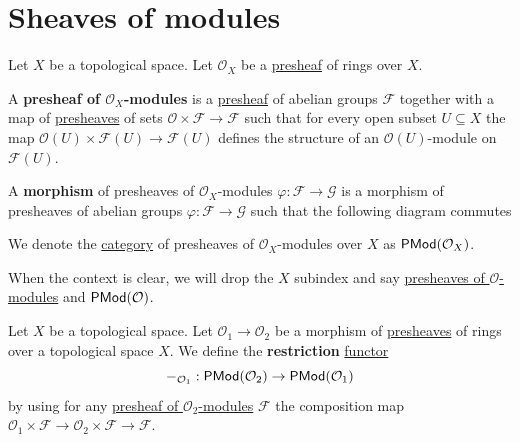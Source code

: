 \documentclass[../../../main]{subfiles}
\begin{document}
\section{Sheaves of modules} \label{sec:sheaves-of-modules}

\begin{definition} \label{def:presheaf-of-modules}
  Let \(X\) be a topological space.
  Let \(\mathcal{O}_{X}\) be a \hyperref[def:presheaf]{presheaf} of rings over \(X\).

  A \textbf{presheaf of \(\mathcal{O}_{X}\)-modules} is a \hyperref[def:presheaf]{presheaf} of abelian groups \(\mathcal{F}\) together with a map of \hyperref[def:presheaf]{presheaves} of sets \(\mathcal{O} \times \mathcal{F} \to \mathcal{F}\) such that for every open subset \(U \subseteq X\) the map \(\mathcal{O}(U) \times \mathcal{F}(U) \to \mathcal{F}(U)\) defines the structure of an \(\mathcal{O}(U)\)-module on \(\mathcal{F}(U)\).

  A \textbf{morphism} of presheaves of \(\mathcal{O}_{X}\)-modules \(\varphi: \mathcal{F} \to \mathcal{G}\) is a morphism of presheaves of abelian groups \(\varphi: \mathcal{F} \to \mathcal{G}\) such that the following diagram commutes
  \begin{center}
  \end{center}

  We denote the \hyperref[def:category]{category} of presheaves of \(\mathcal{O}_{X}\)-modules over \(X\) as \(\mathsf{PMod}(\mathcal{O}_{X})\).
\end{definition}

\begin{notation}
  When the context is clear, we will drop the \(X\) subindex and say \hyperref[def:presheaf-of-modules]{presheaves of \(\mathcal{O}\)-modules} and \(\mathsf{PMod}(\mathcal{O})\).
\end{notation}


\begin{definition} \label{def:restriction-presheaf-of-modules}
  Let \(X\) be a topological space.
  Let \(\mathcal{O}_{1} \to \mathcal{O}_{2}\) be a morphism of \hyperref[def:presheaf]{presheaves} of rings over a topological space \(X\).
  We define the \textbf{restriction} \hyperref[def:functor]{functor}
  \begin{equation*}
    -_{\mathcal{O}_{1}}: \mathsf{PMod}(\mathcal{O}_{2}) \to \mathsf{PMod}(\mathcal{O}_{1})
  \end{equation*}
  by using for any \hyperref[def:presheaf-of-modules]{presheaf of \(\mathcal{O}_{2}\)-modules} \(\mathcal{F}\) the composition map \(\mathcal{O}_{1} \times \mathcal{F} \to \mathcal{O}_{2} \times \mathcal{F} \to \mathcal{F}\).
\end{definition}
\end{document}
